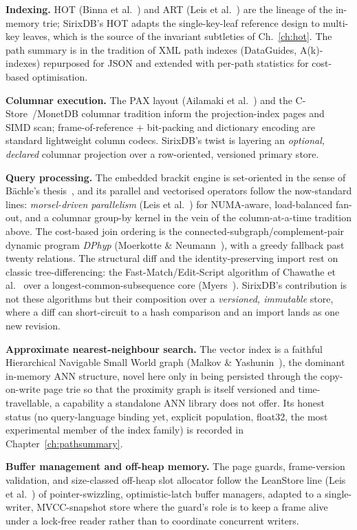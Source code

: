 \documentclass[11pt,a4paper,oneside]{report}
\theoremstyle{sirixthm}
\begin{document}
\textbf{Indexing.} HOT (Binna et al.~\cite{binna}) and ART (Leis et al.~\cite{leisart}) are the lineage of the in-memory
trie; SirixDB's HOT adapts the single-key-leaf reference design to multi-key leaves, which is
the source of the invariant subtleties of Ch.~\ref{ch:hot}. The path summary is in the
tradition of XML path indexes (DataGuides, A(k)-indexes) repurposed for JSON and extended with
per-path statistics for cost-based optimisation.

\textbf{Columnar execution.} The PAX layout (Ailamaki et al.~\cite{ailamaki}) and the C-Store~\cite{cstore}/MonetDB columnar
tradition inform the projection-index pages and SIMD scan; frame-of-reference {+} bit-packing
and dictionary encoding are standard lightweight column codecs. SirixDB's twist is layering an
\emph{optional, declared} columnar projection over a row-oriented, versioned primary store.

\textbf{Query processing.} The embedded brackit engine is set-oriented in the sense of B\"achle's
thesis~\cite{baechle}, and its parallel and vectorised operators follow the now-standard lines:
\emph{morsel-driven parallelism} (Leis et al.~\cite{morsel}) for NUMA-aware, load-balanced fan-out, and a
columnar group-by kernel in the vein of the column-at-a-time tradition above. The cost-based join
ordering is the connected-subgraph/complement-pair dynamic program \emph{DPhyp} (Moerkotte \&
Neumann~\cite{dphyp}), with a greedy fallback past twenty relations. The structural diff and the
identity-preserving import rest on classic tree-differencing: the Fast-Match/Edit-Script algorithm of
Chawathe et al.~\cite{chawathe} over a longest-common-subsequence core (Myers~\cite{myers}). SirixDB's
contribution is not these algorithms but their composition over a \emph{versioned, immutable} store, where
a diff can short-circuit to a hash comparison and an import lands as one new revision.

\textbf{Approximate nearest-neighbour search.} The vector index is a faithful Hierarchical Navigable
Small World graph (Malkov \& Yashunin~\cite{hnsw}), the dominant in-memory ANN structure, novel here only
in being persisted through the copy-on-write page trie so that the proximity graph is itself versioned
and time-travellable, a capability a standalone ANN library does not offer. Its honest status (no
query-language binding yet, explicit population, float32, the most experimental member of the index
family) is recorded in Chapter~\ref{ch:pathsummary}.

\textbf{Buffer management and off-heap memory.} The page guards, frame-version validation, and
size-classed off-heap slot allocator follow the LeanStore line (Leis et al.~\cite{leanstore}) of
pointer-swizzling, optimistic-latch buffer managers, adapted to a single-writer, MVCC-snapshot store
where the guard's role is to keep a frame alive under a lock-free reader rather than to coordinate
concurrent writers.
\end{document}
